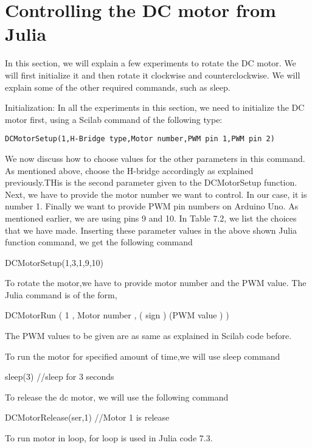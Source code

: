 \section{Controlling the DC motor from Julia}

In this section, we will explain a few experiments to rotate the DC motor. We will
first initialize it and then rotate it clockwise and counterclockwise. We will explain
some of the other required commands, such as sleep.

Initialization:
In all the experiments in this section, we need to initialize the DC motor first, using
a Scilab command of the following type:

\begin{lstlisting}[style=nonumbers]
  DCMotorSetup(1,H-Bridge type,Motor number,PWM pin 1,PWM pin 2)
\end{lstlisting}


We now discuss how to choose values for the other parameters in this command. As
mentioned above, choose the H-bridge accordingly as explained previously.THis is the second
parameter given to the DCMotorSetup function. Next, we have to provide
the motor number we want to control. In our case, it is number 1. Finally we want
to provide PWM pin numbers on Arduino Uno. As mentioned earlier, we are using
pins 9 and 10. In Table 7.2, we list the choices that we have made. Inserting these
parameter values in the above shown Julia function command, we get the following command

DCMotorSetup(1,3,1,9,10)

To rotate the motor,we have to provide motor number
and the PWM value. The Julia command is of the form,

DCMotorRun ( 1 , Motor number , ( sign ) (PWM value ) )

The PWM values to be given are as same as explained in Scilab code before.

To run the motor for specified amount of time,we will use sleep command

sleep(3) //sleep for 3 seconds

To release the dc motor, we will use the following command

DCMotorRelease(ser,1) //Motor 1 is release

To run motor in loop, for loop is used in Julia code 7.3.




